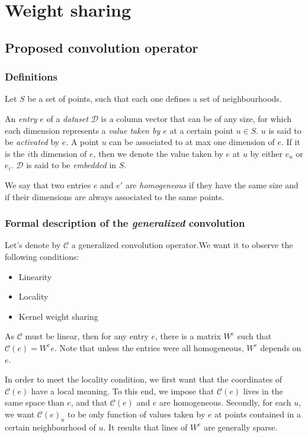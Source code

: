 \section{Weight sharing}

\subsection{Proposed convolution operator}
\label{operator}
  \subsubsection{Definitions}

Let $S$ be a set of points, such that each one defines a set of neighbourhoods.

An \textit{entry} $e$ of a \textit{dataset} $\mathcal{D}$ is a column vector that can be of any size, for which each dimension represents a \textit{value taken by $e$} at a certain point $u \in S$. $u$ is said to be \textit{activated} by $e$. A point $u$ can be associated to at max one dimension of $e$. If it is the $i$th dimension of $e$, then we denote the value taken by $e$ at $u$ by either $e_u$ or $e_i$. $\mathcal{D}$ is said to be \textit{embedded} in $S$.

We say that two entries $e$ and $e'$ are \textit{homogeneous} if they have the same size and if their dimensions are always associated to the same points.

  \subsubsection{Formal description of the \textit{generalized} convolution}

Let's denote by $\mathcal{C}$ a generalized convolution operator.We want it to observe the following conditions:
\begin{itemize}
  \item Linearity
  \item Locality
  \item Kernel weight sharing
\end{itemize}

As $\mathcal{C}$ must be linear, then for any entry $e$, there is a matrix $W^e$ such that $\mathcal{C}(e) = W^ee$. Note that unless the entries were all homogeneous, $W^e$ depends on $e$.

In order to meet the locality condition, we first want that the coordinates of $\mathcal{C}(e)$ have a local meaning. To this end, we impose that $\mathcal{C}(e)$ lives in the same space than $e$, and that $\mathcal{C}(e)$ and $e$ are homogeneous. Secondly, for each $u$, we want $\mathcal{C}(e)_u$ to be only function of values taken by $e$ at points contained in a certain neighbourhood of $u$. It results that lines of $W^e$ are generally sparse.


